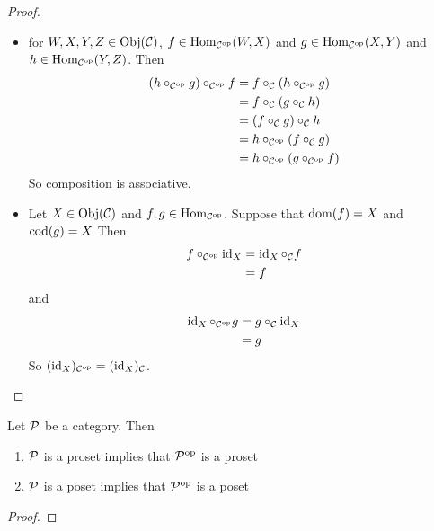 \documentclass{book}
\begin{document}
	\begin{proof}\
		\begin{itemize}
			\item for $W,X,Y,Z \in \operatorname{Obj}(\mathcal{C})$, $f \in \operatorname{Hom}_{\mathcal{C}^{\text{op}}}(W, X)$ and $g \in \operatorname{Hom}_{\mathcal{C}^{\text{op}}}(X, Y)$ and $h \in \operatorname{Hom}_{\mathcal{C}^{\text{op}}}(Y, Z)$. Then 
			\begin{align*}
				(h \circ_{\mathcal{C}^{\text{op}}} g) \circ_{\mathcal{C}^{\text{op}}} f 
				&= f \circ_{\mathcal{C}}( h \circ_{\mathcal{C}^{\text{op}}} g) \\
				&= f \circ_{\mathcal{C}} (g \circ_{\mathcal{C}} h) \\
				&= (f \circ_{\mathcal{C}} g) \circ_{\mathcal{C}} h \\
				&= h \circ_{\mathcal{C}^{\text{op}}} (f \circ_{\mathcal{C}} g) \\
				&= h \circ_{\mathcal{C}^{\text{op}}} (g \circ_{\mathcal{C}^{\text{op}}} f)
			\end{align*}
			So composition is associative.
			\item Let $X \in \operatorname{Obj}(\mathcal{C})$ and $f,g \in \operatorname{Hom}_{\mathcal{C}^{\text{op}}}$. Suppose that $\operatorname{dom}(f) = X$ and $\operatorname{cod}(g) = X$ 
			Then 
			\begin{align*}
				f  \circ_{\mathcal{C}^{\text{op}}} \operatorname{id}_X
				&= \operatorname{id}_X  \circ_{\mathcal{C}} f \\
				&= f
			\end{align*}
			and 
			\begin{align*}
				\operatorname{id}_X  \circ_{\mathcal{C}^{\text{op}}} g 
				&= g \circ_{\mathcal{C}} \operatorname{id}_X \\
				&= g
			\end{align*}
		So $(\operatorname{id}_X)_{\mathcal{C}^{\text{op}}} =  (\operatorname{id}_X)_{\mathcal{C}}$.
		\end{itemize}
	\end{proof}

	\begin{ex}
		Let $\mathcal{P}$ be a category. Then 
		\begin{enumerate}
			\item $\mathcal{P}$ is a proset implies that $\mathcal{\mathcal{P}}^{\text{op}}$ is a proset
			\item $\mathcal{P}$ is a poset implies that $\mathcal{\mathcal{P}}^{\text{op}}$ is a poset
		\end{enumerate} 
	\end{ex}

	\begin{proof}
	\end{proof}
\end{document}
